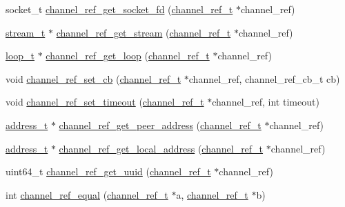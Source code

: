 \begin{DoxyCompactItemize}
\item 
socket\+\_\+t \hyperlink{group___xE7_xAE_xA1_xE9_x81_x93_xE5_xBC_x95_xE7_x94_xA8_gaf0c977ef05b7e767a8ef166a8037ec8b}{channel\+\_\+ref\+\_\+get\+\_\+socket\+\_\+fd} (\hyperlink{struct__channel__ref__t}{channel\+\_\+ref\+\_\+t} $\ast$channel\+\_\+ref)
\item 
\hyperlink{struct__stream__t}{stream\+\_\+t} $\ast$ \hyperlink{group___xE7_xAE_xA1_xE9_x81_x93_xE5_xBC_x95_xE7_x94_xA8_gaf8d2758e1e063e04512049c9a9869d5e}{channel\+\_\+ref\+\_\+get\+\_\+stream} (\hyperlink{struct__channel__ref__t}{channel\+\_\+ref\+\_\+t} $\ast$channel\+\_\+ref)
\item 
\hyperlink{struct__loop__t}{loop\+\_\+t} $\ast$ \hyperlink{group___xE7_xAE_xA1_xE9_x81_x93_xE5_xBC_x95_xE7_x94_xA8_gad840fd786ca7092d528a8fc45c2e2a76}{channel\+\_\+ref\+\_\+get\+\_\+loop} (\hyperlink{struct__channel__ref__t}{channel\+\_\+ref\+\_\+t} $\ast$channel\+\_\+ref)
\item 
void \hyperlink{group___xE7_xAE_xA1_xE9_x81_x93_xE5_xBC_x95_xE7_x94_xA8_ga7627dbcdb87269ef2fae5bcbbb210720}{channel\+\_\+ref\+\_\+set\+\_\+cb} (\hyperlink{struct__channel__ref__t}{channel\+\_\+ref\+\_\+t} $\ast$channel\+\_\+ref, channel\+\_\+ref\+\_\+cb\+\_\+t cb)
\item 
void \hyperlink{group___xE7_xAE_xA1_xE9_x81_x93_xE5_xBC_x95_xE7_x94_xA8_ga4e46196f7ac40bdd14a1407167e88b7b}{channel\+\_\+ref\+\_\+set\+\_\+timeout} (\hyperlink{struct__channel__ref__t}{channel\+\_\+ref\+\_\+t} $\ast$channel\+\_\+ref, int timeout)
\item 
\hyperlink{struct__address__t}{address\+\_\+t} $\ast$ \hyperlink{group___xE7_xAE_xA1_xE9_x81_x93_xE5_xBC_x95_xE7_x94_xA8_ga7bcafd2461a1edfde9c581cb946dcd44}{channel\+\_\+ref\+\_\+get\+\_\+peer\+\_\+address} (\hyperlink{struct__channel__ref__t}{channel\+\_\+ref\+\_\+t} $\ast$channel\+\_\+ref)
\item 
\hyperlink{struct__address__t}{address\+\_\+t} $\ast$ \hyperlink{group___xE7_xAE_xA1_xE9_x81_x93_xE5_xBC_x95_xE7_x94_xA8_ga1dcf6af0c992fa21f9dcd03c8f763ec4}{channel\+\_\+ref\+\_\+get\+\_\+local\+\_\+address} (\hyperlink{struct__channel__ref__t}{channel\+\_\+ref\+\_\+t} $\ast$channel\+\_\+ref)
\item 
uint64\+\_\+t \hyperlink{group___xE7_xAE_xA1_xE9_x81_x93_xE5_xBC_x95_xE7_x94_xA8_ga3fd39b821fef38abd518db6240e79068}{channel\+\_\+ref\+\_\+get\+\_\+uuid} (\hyperlink{struct__channel__ref__t}{channel\+\_\+ref\+\_\+t} $\ast$channel\+\_\+ref)
\item 
int \hyperlink{group___xE7_xAE_xA1_xE9_x81_x93_xE5_xBC_x95_xE7_x94_xA8_gad44fcb68845cb3ebb582a9de6db9abd0}{channel\+\_\+ref\+\_\+equal} (\hyperlink{struct__channel__ref__t}{channel\+\_\+ref\+\_\+t} $\ast$a, \hyperlink{struct__channel__ref__t}{channel\+\_\+ref\+\_\+t} $\ast$b)
\end{DoxyCompactItemize}


